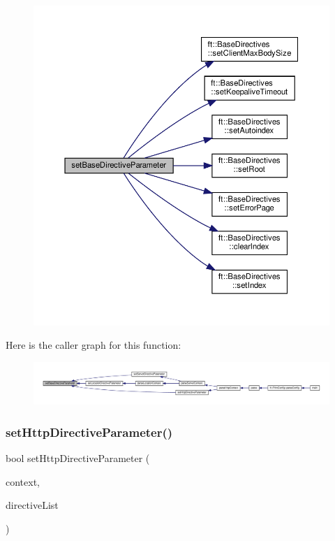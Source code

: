 \begin{figure}[H]
\begin{center}
\leavevmode
\includegraphics[width=350pt]{classft_1_1_parser_a9f412d172694519d0d8dd9edacd257c0_cgraph}
\end{center}
\end{figure}
Here is the caller graph for this function\+:
\nopagebreak
\begin{figure}[H]
\begin{center}
\leavevmode
\includegraphics[width=350pt]{classft_1_1_parser_a9f412d172694519d0d8dd9edacd257c0_icgraph}
\end{center}
\end{figure}
\mbox{\label{classft_1_1_parser_a5d287909e4c513e20b017ba0699b0cbf}} 
\subsubsection{\texorpdfstring{set\+Http\+Directive\+Parameter()}{setHttpDirectiveParameter()}}
{\footnotesize\ttfamily bool set\+Http\+Directive\+Parameter (\begin{DoxyParamCaption}\item[{\hyperlink{classft_1_1_http_block}{Http\+Block} \&}]{context,  }\item[{std\+::vector$<$ \hyperlink{classft_1_1_directive}{Directive} $>$}]{directive\+List }\end{DoxyParamCaption})\hspace{0.3cm}{\ttfamily [private]}}



